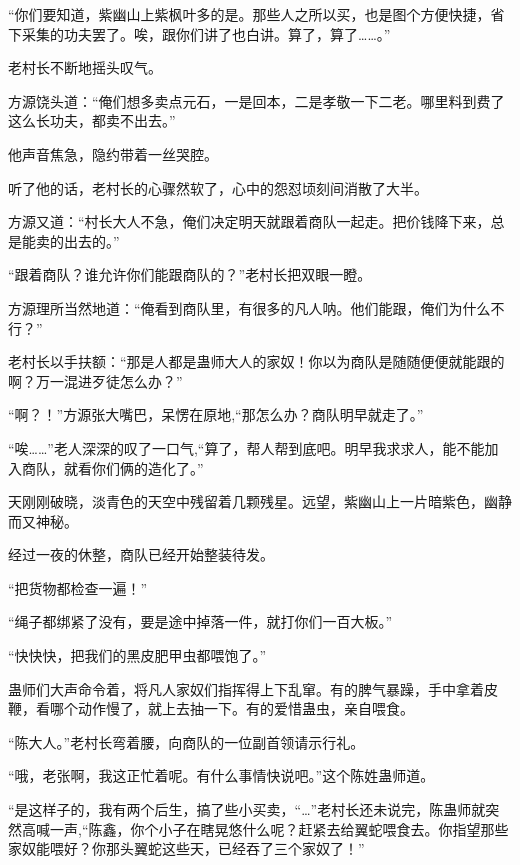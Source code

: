 
\begin{this_body}



“你们要知道，紫幽山上紫枫叶多的是。那些人之所以买，也是图个方便快捷，省下采集的功夫罢了。唉，跟你们讲了也白讲。算了，算了……。”

老村长不断地摇头叹气。

方源饶头道：“俺们想多卖点元石，一是回本，二是孝敬一下二老。哪里料到费了这么长功夫，都卖不出去。”

他声音焦急，隐约带着一丝哭腔。

听了他的话，老村长的心骤然软了，心中的怨怼顷刻间消散了大半。

方源又道：“村长大人不急，俺们决定明天就跟着商队一起走。把价钱降下来，总是能卖的出去的。”

“跟着商队？谁允许你们能跟商队的？”老村长把双眼一瞪。

方源理所当然地道：“俺看到商队里，有很多的凡人呐。他们能跟，俺们为什么不行？”

老村长以手扶额：“那是人都是蛊师大人的家奴！你以为商队是随随便便就能跟的啊？万一混进歹徒怎么办？”

“啊？！”方源张大嘴巴，呆愣在原地,“那怎么办？商队明早就走了。”

“唉……”老人深深的叹了一口气,“算了，帮人帮到底吧。明早我求求人，能不能加入商队，就看你们俩的造化了。”

天刚刚破晓，淡青色的天空中残留着几颗残星。远望，紫幽山上一片暗紫色，幽静而又神秘。

经过一夜的休整，商队已经开始整装待发。

“把货物都检查一遍！”

“绳子都绑紧了没有，要是途中掉落一件，就打你们一百大板。”

“快快快，把我们的黑皮肥甲虫都喂饱了。”

蛊师们大声命令着，将凡人家奴们指挥得上下乱窜。有的脾气暴躁，手中拿着皮鞭，看哪个动作慢了，就上去抽一下。有的爱惜蛊虫，亲自喂食。

“陈大人。”老村长弯着腰，向商队的一位副首领请示行礼。

“哦，老张啊，我这正忙着呢。有什么事情快说吧。”这个陈姓蛊师道。

“是这样子的，我有两个后生，搞了些小买卖，“…”老村长还未说完，陈蛊师就突然高喊一声,“陈鑫，你个小子在瞎晃悠什么呢？赶紧去给翼蛇喂食去。你指望那些家奴能喂好？你那头翼蛇这些天，已经吞了三个家奴了！”


\end{this_body}
